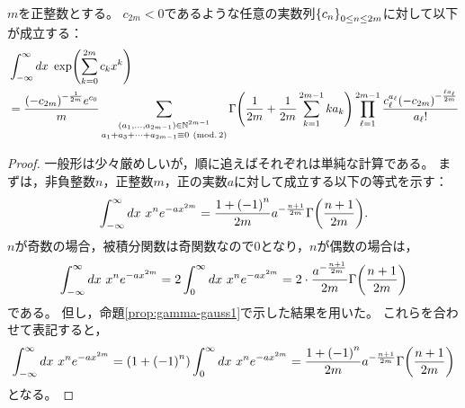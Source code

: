 \documentclass[a4paper,draft]{ltjsarticle}
\begin{document}
\begin{prop}[Gauss積分の一般化 その2]
    $m$を正整数とする。
    $c_{2m}<0$であるような任意の実数列$\seq{c_n}{0\leq n\leq 2m}$に対して以下が成立する：
    \begin{align}
        &\int_{-\infty}^\infty dx\ \fun{\exp}{\sum_{k=0}^{2m} c_k x^k}
        \\
        &=\frac{\pare{-c_{2m}}^{-\frac{1}{2m}}e^{c_0}}{m}\sum_{
            \substack{
                \pare{a_1,\dots, a_{2m-1}}\in \N^{2m-1}
                \\
                a_1+a_3+\cdots+a_{2m-1}\equiv 0\ \pare{\mathrm{mod}.\, 2}
            }
        }
        \fun{\Gamma}{\frac{1}{2m}+\frac{1}{2m}\sum_{k=1}^{2m-1}k a_k}
        \prod_{\ell = 1}^{2m-1}\frac{c_\ell^{a_\ell} \pare{-c_{2m}}^{-\frac{\ell a_\ell}{2m}}}{a_\ell !}
    \end{align}
    \begin{proof}
        一般形は少々厳めしいが，順に追えばそれぞれは単純な計算である。
        まずは，非負整数$n$，正整数$m$，正の実数$a$に対して成立する以下の等式を示す：
        \begin{equation}
            \int_{-\infty}^\infty dx\ x^{n}e^{-ax^{2m}}=\frac{1+\pare{-1}^n}{2m}a^{-\frac{n+1}{2m}}\fun{\Gamma}{\frac{n+1}{2m}}.
        \end{equation}
        $n$が奇数の場合，被積分関数は奇関数なので$0$となり，$n$が偶数の場合は，
        \begin{equation}
            \int_{-\infty}^\infty dx\ x^{n}e^{-ax^{2m}}=2\int_0^\infty dx\ x^{n}e^{-ax^{2m}}
            =2\cdot \frac{a^{-\frac{n+1}{2m}}}{2m}\fun{\Gamma}{\frac{n+1}{2m}}
        \end{equation}
        である。
        但し，命題\ref{prop:gamma-gauss1}で示した結果を用いた。
        これらを合わせて表記すると，
        \begin{equation}
            \int_{-\infty}^\infty dx\ x^{n}e^{-ax^{2m}}=\pare{1+\pare{-1}^n}\int_{0}^\infty dx\ x^{n}e^{-ax^{2m}}=\frac{1+\pare{-1}^n}{2m}a^{-\frac{n+1}{2m}}\fun{\Gamma}{\frac{n+1}{2m}}
        \end{equation}
        となる。


\end{proof}
\end{prop}
\end{document}

